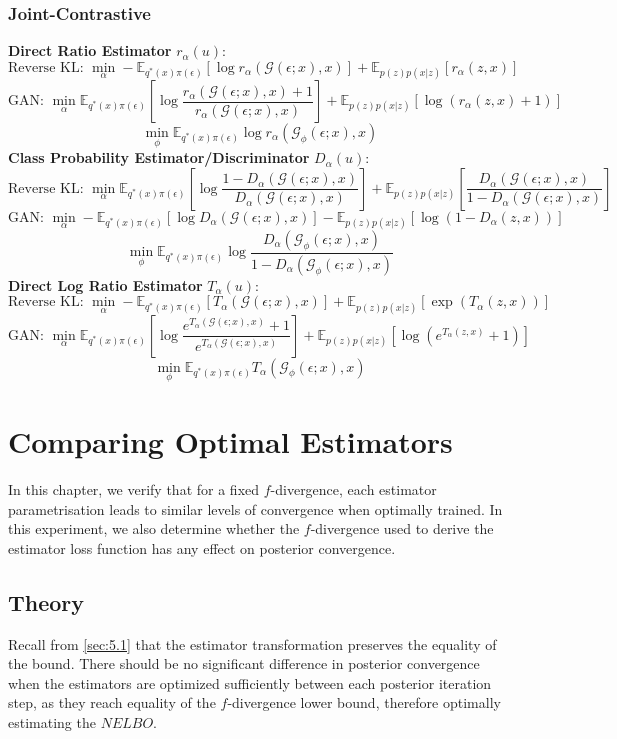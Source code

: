 \documentclass[honours,12pt]{unswthesis}
\newcommand{\E}{\mathbb{E}}
\numberwithin{equation}{section}
\theoremstyle{definition}
\begin{document}
\subsection{Joint-Contrastive}
\textbf{Direct Ratio Estimator} $r_\alpha(u)$:
\[\text{Reverse KL: }\min_\alpha -\E_{q^*(x)\pi(\epsilon)}[\log r_\alpha(\mathcal{G}(\epsilon;x),x)]+\E_{p(z)p(x|z)}[r_\alpha(z,x)]\]
\[\text{GAN: }\min_\alpha \E_{q^*(x)\pi(\epsilon)}\left[\log \frac{r_\alpha(\mathcal{G}(\epsilon;x),x)+1}{r_\alpha(\mathcal{G}(\epsilon;x),x)}\right]+\E_{p(z)p(x|z)}[\log(r_\alpha(z,x)+1)]\]
\[\min_\phi \E_{q^*(x)\pi(\epsilon)}\log r_\alpha(\mathcal{G}_\phi(\epsilon;x),x)\]
\textbf{Class Probability Estimator/Discriminator} $D_\alpha(u)$:
\[\text{Reverse KL: }\min_\alpha \E_{q^*(x)\pi(\epsilon)}\left[\log \frac{1-D_\alpha(\mathcal{G}(\epsilon;x),x)}{D_\alpha(\mathcal{G}(\epsilon;x),x)}\right]+\E_{p(z)p(x|z)}\left[\frac{D_\alpha(\mathcal{G}(\epsilon;x),x)}{1-D_\alpha(\mathcal{G}(\epsilon;x),x)}\right]\]
\[\text{GAN: }\min_\alpha -\E_{q^*(x)\pi(\epsilon)}[\log D_\alpha(\mathcal{G}(\epsilon;x),x)]-\E_{p(z)p(x|z)}[\log(1-D_\alpha(z,x))]\]
\[\min_\phi \E_{q^*(x)\pi(\epsilon)}\log \frac{D_\alpha(\mathcal{G}_\phi(\epsilon;x),x)}{1-D_\alpha(\mathcal{G}_\phi(\epsilon;x),x)}\]
\textbf{Direct Log Ratio Estimator} $T_\alpha(u)$:
\[\text{Reverse KL: }\min_\alpha -\E_{q^*(x)\pi(\epsilon)}[T_\alpha(\mathcal{G}(\epsilon;x),x)]+\E_{p(z)p(x|z)}[\exp(T_\alpha(z,x))]\]
\[\text{GAN: }\min_\alpha \E_{q^*(x)\pi(\epsilon)}\left[\log \frac{e^{T_\alpha(\mathcal{G}(\epsilon;x),x)}+1}{e^{T_\alpha(\mathcal{G}(\epsilon;x),x)}}\right]+\E_{p(z)p(x|z)}[\log(e^{T_\alpha(z,x)}+1)]\]
\[\min_\phi \E_{q^*(x)\pi(\epsilon)}T_\alpha(\mathcal{G}_\phi(\epsilon;x),x)\]
\chapter{Comparing Optimal Estimators}\label{ch6}
In this chapter, we verify that for a fixed $f$-divergence, each estimator parametrisation leads to similar levels of convergence when optimally trained. In this experiment, we also determine whether the $f$-divergence used to derive the estimator loss function has any effect on posterior convergence.
\section{Theory}
Recall from \autoref{sec:5.1} that the estimator transformation preserves the equality of the bound. There should be no significant difference in posterior convergence when the estimators are optimized sufficiently between each posterior iteration step, as they reach equality of the $f$-divergence lower bound, therefore optimally estimating the $NELBO$.
\end{document}
